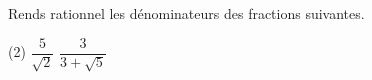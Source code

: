 %
%
    Rends rationnel les dénominateurs des fractions suivantes.
    \begin{tasks}(2)
        \task \(\dfrac{5}{\sqrt{2}}\)
        \task \(\dfrac{3}{3+\sqrt{5}}\)
    \end{tasks}
